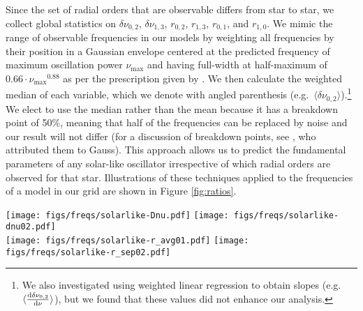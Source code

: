 \documentclass[manuscript]{aastex}
\begin{document}
Since the set of radial orders that are observable differs from star to star, we collect global statistics on $\delta\nu_{0,2}$, $\delta\nu_{1,3}$, $r_{0,2}$, $r_{1,3}$, $r_{0,1}$, and $r_{1,0}$. %
We mimic the range of observable frequencies in our models by weighting all frequencies by their position in a Gaussian envelope centered at the predicted frequency of maximum oscillation power $\nu_{\max}$ and having full-width at half-maximum of $0.66\cdot\nu_{\max}{}^{0.88}$ as per the prescription given by \citet{2012A&A...537A..30M}. We then calculate the weighted median of each variable, which we denote with angled parenthesis (e.g.~$\langle\delta\nu_{0,2}\rangle$).\footnote{We also investigated using weighted linear regression to obtain slopes (e.g.~$\langle\dv{\delta\nu_{0,2}}{\nu}\rangle$), but we found that these values did not enhance our analysis.} We elect to use the median rather than the mean because it has a breakdown point of 50\%, meaning that half of the frequencies can be replaced by noise and our result will not differ (for a discussion of breakdown points, see \citealt{hampel1971general}, who attributed them to Gauss). This approach allows us to predict the fundamental parameters of any solar-like oscillator irrespective of which radial orders are observed for that star. Illustrations of these techniques applied to the frequencies of a model in our grid are shown in Figure \ref{fig:ratios}. 

\begin{figure*}
    \centering
    \texttt{[image: figs/freqs/solarlike-Dnu.pdf]}\hfill
    \texttt{[image: figs/freqs/solarlike-dnu02.pdf]}\\
    \texttt{[image: figs/freqs/solarlike-r\_avg01.pdf]}\hfill
    \texttt{[image: figs/freqs/solarlike-r\_sep02.pdf]}%
    \caption{The large and small frequency separations ($\Delta\nu$ and $\delta\nu_{0,2}$, top) and frequency ratios ($r_{0,1}$ and $r_{0,2}$, bottom) of a model in our grid. The vertical dotted line indicates $\nu_{\max}$. A $\nu_{\max}$-weighted linear fit is indicated with a dashed diagonal line to guide the eye. Point sizes and colors are proportional to the applied weighting, with blue points having a large influence and red points having little. \textbf{todo: find example with less whitespace}}%
    \label{fig:ratios}
\end{figure*}
\end{document}
